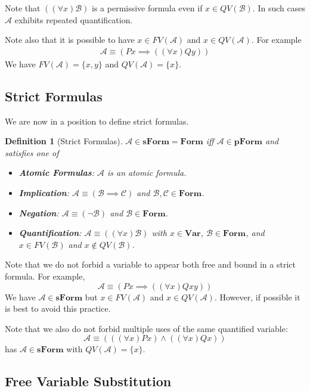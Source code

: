 \documentclass[12pt]{article}
\theoremstyle{break}
\newtheorem{definition}{Definition}[section]
\theoremstyle{break}
\theoremstyle{break}
\theoremstyle{break}
\theoremstyle{break}
\newtheorem{informal definition}[definition]{Informal Definition}
\newcommand{\mc}[1]{\mathcal{#1}}
\begin{document}
Note that $((\forall x)\mc{B})$ is a permissive formula even if $x\in QV(\mc{B})$.
In such cases $\mc{A}$ exhibits repeated quantification.

Note also that it is possible to have $x\in FV(\mc{A})$ and $x\in QV(\mc{A})$.
For example
\begin{align}
\mc{A} \equiv (Px \implies ((\forall x) Qy))
\end{align}
We have $FV(\mc{A}) = \{x, y\}$ and $QV(\mc{A}) = \{x\}$.

\subsection{Strict Formulas}

We are now in a position to define strict formulas.
\begin{definition}[Strict Formulas]
$\mc{A}\in\textbf{sForm} = \textbf{Form}$ iff $\mc{A} \in \textbf{pForm}$ and satisfies one of
\begin{itemize}
\item{\textbf{Atomic Formulas}: $\mc{A}$ is an atomic formula.}
\item{\textbf{Implication}: $\mc{A} \equiv (\mc{B} \implies \mc{C})$ and $\mc{B}, \mc{C} \in \textbf{Form}$.}
\item{\textbf{Negation}: $\mc{A} \equiv (\lnot \mc{B})$ and $\mc{B}\in\textbf{Form}$.}
\item{\textbf{Quantification}: $\mc{A} \equiv ((\forall x)\mc{B})$ with $x\in\textbf{Var}$, $\mc{B}\in\textbf{Form}$, and $x\in FV(\mc{B})$ and $x\not\in QV(\mc{B})$.}
\end{itemize}
\end{definition}

Note that we do not forbid a variable to appear both free and bound in a strict formula.
For example,
$$
\mc{A} \equiv (Px \implies ((\forall x) Qxy))
$$
We have $\mc{A}\in\textbf{sForm}$ but $x\in FV(\mc{A})$ and $x\in QV(\mc{A})$.
However, if possible it is best to avoid this practice.

Note that we also do not forbid multiple uses of the same quantified variable:
$$
\mc{A}\equiv (((\forall x) Px) \land ((\forall x) Qx))
$$
has $\mc{A}\in\textbf{sForm}$ with $QV(\mc{A}) = \{x\}$.

\subsection{Free Variable Substitution}
\end{document}

